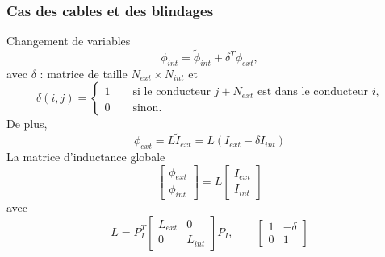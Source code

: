 \begin{frame}
\frametitle{Cas des cables et des blindages}
Changement de variables
\begin{equation}
\phi_{int} = \tilde{\phi}_{int} +\delta^T \phi_{ext},
\end{equation}
avec $\delta$ : matrice de taille $N_{ext}\times N_{int}$ et
\begin{equation}
\delta(i,j)=
\begin{cases}
1 \qquad \text{si le conducteur $j+N_{ext}$ est dans le conducteur $i$,} \\
0 \qquad \text{sinon.}
\end{cases}
\end{equation}
De plus, 
\begin{equation}
\phi_{ext} = L\tilde{I}_{ext}=L(I_{ext}-\delta I_{int})
\end{equation}
La matrice d'inductance globale
\[ \left[ \begin{array} {c}
\phi_{ext} \\
\phi_{int} \end{array}  \right]  = 
L
 \left[ \begin{array} {c}
I_{ext} \\
I_{int} \end{array}  \right] 
\] 
avec
\[ L = P_I^T \left[ \begin{array} {cc}
L_{ext} &0 \\
0 & L_{int} \end{array}  \right] P_I , \qquad 
\left[ \begin{array} {cc}
1 & -\delta \\
0 & 1 \end{array}  \right]
 \] 

\end{frame}
